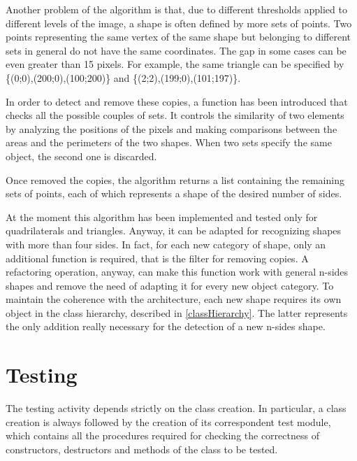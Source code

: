 		
		

		
		


		
		
		
		
		Another problem of the algorithm is that, due to different thresholds applied to different levels of the image, a shape is often defined by more sets of points.
		Two points representing the same vertex of the same shape but belonging to different sets in general do not have the same coordinates.
		The gap in some cases can be even greater than 15 pixels. 
		For example, the same triangle can be specified by \{(0;0),(200;0),(100;200)\} and \{(2;2),(199;0),(101;197)\}. 
		
		

		In order to detect and remove these copies, a function has been introduced that checks all the possible couples of sets. 
		It controls the similarity of two elements by analyzing the positions of the pixels and making comparisons between the areas and the perimeters of the two shapes. 
		When two sets specify the same object, the second one is discarded. 
		
		Once removed the copies, the algorithm returns a list containing the remaining sets of points, each of which represents a shape of the desired number of sides.

		At the moment this algorithm has been implemented and tested only for quadrilaterals and triangles. 
		Anyway, it can be adapted for recognizing shapes with more than four sides.
		In fact, for each new category of shape, only an additional function is required, that is the filter for removing copies. 
		A refactoring operation, anyway, can make this function work with general n-sides shapes and remove the need of adapting it for every new object category.
		To maintain the coherence with the architecture, each new shape requires its own object in the class hierarchy, described in \ref{classHierarchy}. 
		The latter represents the only addition really necessary for the detection of a new n-sides shape.
		


	\section{Testing}
	The testing activity depends strictly on the class creation.
	In particular, a class creation is always followed by the creation of its correspondent test module, which contains all the procedures required for checking the correctness of constructors, destructors and methods of the class to be tested.
	

